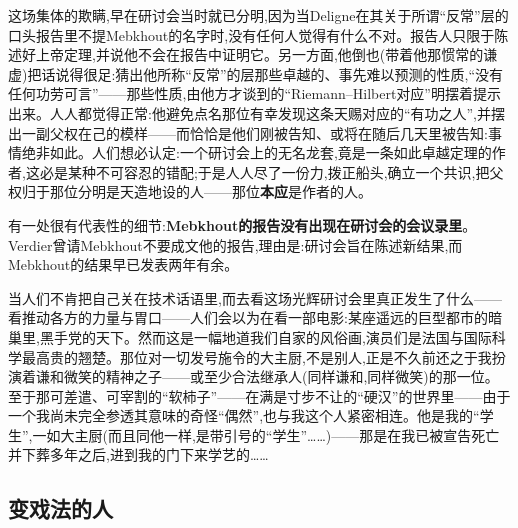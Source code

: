 这场集体的欺瞒,早在研讨会当时就已分明,因为当Deligne在其关于所谓“反常”层的口头报告里不提Mebkhout的名字时,没有任何人觉得有什么不对。报告人只限于陈述好上帝定理,并说\dmark{}他不会在报告中证明它。另一方面,他倒也(带着他那惯常的谦虚)把话说得很足:猜出他所称“反常”的层那些卓越的、事先难以预测的性质,“没有任何功劳可言”——那些性质,由他方才谈到的“Riemann--Hilbert对应”明摆着提示出来。人人都觉得正常:他避免点名那位有幸发现这条天赐对应的“有功之人”,并摆出一副父权在己的模样——而恰恰是他们刚被告知、或将在随后几天里被告知:事情绝非如此。人们想必认定:一个研讨会上的无名龙套,竟是一条如此卓越定理的作者,这必是某种不可容忍的错配;于是人人尽了一份力,拨正船头,确立一个共识,把父权归于那位分明是天造地设的人——那位\textbf{本应}是作者的人。

有一处很有代表性的细节:\textbf{Mebkhout的报告没有出现在研讨会的会议录里}。Verdier曾请Mebkhout不要成文他的报告,理由是:研讨会旨在陈述新结果,而Mebkhout的结果早已发表两年有余。

当人们不肯把自己关在技术话语里,而去看这场光辉研讨会里真正发生了什么——看推动各方的力量与胃口——人们会以为在看一部电影:某座遥远\dmark{}的巨型都市的暗巢里,黑手党的天下。然而这是一幅地道我们自家的风俗画,演员们是法国与国际科学最高贵的翘楚。那位对一切发号施令的大主厨,不是别人,正是不久前还之于我扮演着谦和微笑的精神之子——或至少合法继承人(同样谦和,同样微笑)的那一位。至于那可差遣、可宰割的“软柿子”——在满是寸步不让的“硬汉”的世界里——由于一个我尚未完全参透其意味的奇怪“偶然”,也与我这个人紧密相连。他是我的“学生”,一如大主厨(而且同他一样,是带引号的“学生”……)——那是在我已被宣告死亡并下葬多年之后,进到我的门下来学艺的……

\subsection{变戏法的人}


